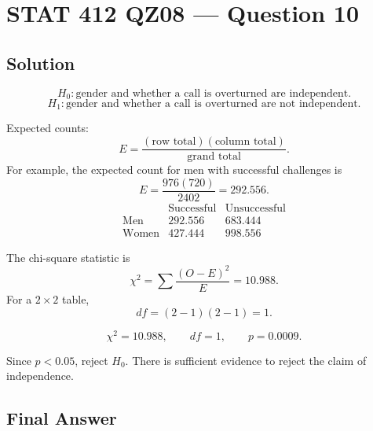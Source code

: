 \documentclass[11pt]{article}
\begin{document}
\section*{STAT 412 QZ08 --- Question 10}

\subsection*{Solution}

\[
H_0:\text{gender and whether a call is overturned are independent.}
\]
\[
H_1:\text{gender and whether a call is overturned are not independent.}
\]

Expected counts:
\[
E=\frac{(\text{row total})(\text{column total})}{\text{grand total}}.
\]
For example, the expected count for men with successful challenges is
\[
E=\frac{976(720)}{2402}=292.556.
\]
\[
\begin{array}{c|cc}
 & \text{Successful} & \text{Unsuccessful}\\ \hline
\text{Men} & 292.556 & 683.444\\
\text{Women} & 427.444 & 998.556
\end{array}
\]

The chi-square statistic is
\[
\chi^2=\sum\frac{(O-E)^2}{E}=10.988.
\]
For a \(2\times2\) table,
\[
df=(2-1)(2-1)=1.
\]

\[
\chi^2=10.988,\qquad df=1,\qquad p=0.0009.
\]

Since \(p<0.05\), reject \(H_0\). There is sufficient evidence to reject the claim of independence.

\subsection*{Final Answer}

\end{document}
